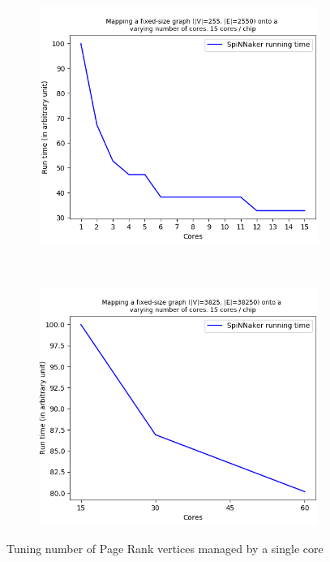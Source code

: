 \begin{figure}[!ht]
    \centering
    \begin{subfigure}[b]{0.5\textwidth}
        \includegraphics[width=\textwidth]{figures/atoms_per_core_vs_running_time-1.png}
        \caption{} \label{fig:graph21}
    \end{subfigure}%
    ~ %
    \begin{subfigure}[b]{0.5\textwidth}
        \includegraphics[width=\textwidth]{figures/atoms_per_core_vs_running_time-2.png}
        \caption{} \label{fig:graph22}
    \end{subfigure}
    \caption{Tuning number of Page Rank vertices managed by a single core}
    \label{fig:graph2}
\end{figure} 

